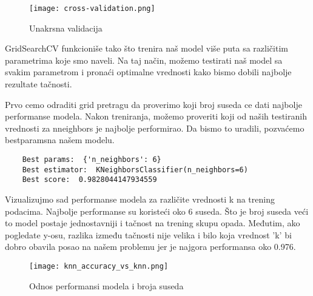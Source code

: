 \documentclass[a4paper,12pt]{article}
\begin{document}
\clearpage

\begin{figure}[h!]
\centering
\texttt{[image: cross-validation.png]}
\caption{Unakrsna validacija}
\label{fig:cross_validation}
\end{figure}


GridSearchCV funkcioniše tako što trenira naš model više puta sa različitim parametrima koje smo naveli. Na taj način, možemo testirati naš model sa svakim parametrom i pronaći optimalne vrednosti kako bismo dobili najbolje rezultate tačnosti.

Prvo cemo odraditi grid pretragu da proverimo koji broj suseda ce dati najbolje performanse modela.
Nakon treniranja, možemo proveriti koji od naših testiranih vrednosti za n\textunderscore neighbors je najbolje performirao. Da bismo to uradili, pozvaćemo best\textunderscore params\textunderscore  na našem modelu.

\begin{verbatim}
    Best params:  {'n_neighbors': 6}
    Best estimator:  KNeighborsClassifier(n_neighbors=6)
    Best score:  0.9828044147934559
\end{verbatim}

Vizualizujmo sad performanse modela za različite vrednosti k na trening podacima. Najbolje performanse su koristeći oko 6 suseda. Što je broj suseda veći to model postaje jednostavniji i tačnost na trening skupu opada. Međutim, ako pogledate y-osu, razlika između tačnosti nije velika i bilo koja vrednost 'k' bi dobro obavila posao na našem problemu jer je najgora performansa oko 0.976.

\begin{figure}[h!]
\centering
\texttt{[image: knn\_accuracy\_vs\_knn.png]}
\caption{Odnos performansi modela i broja suseda}
\label{fig:knn_accuracy_vs_knn}
\end{figure}
\end{document}
